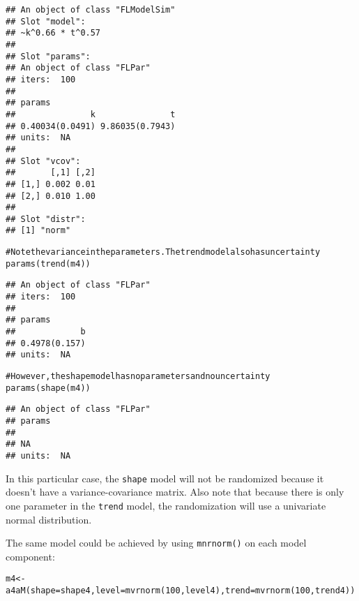 \documentclass[a4paper,english,10pt]{article}\usepackage[]{graphicx}\usepackage[]{color}
\makeatletter
\newcommand{\hlnum}[1]{\textcolor[rgb]{0.2,0.2,0.2}{#1}}%
\newcommand{\hlcom}[1]{\textcolor[rgb]{0.2,0.267,0.4}{#1}}%
\newcommand{\hlstd}[1]{\textcolor[rgb]{0,0,0}{#1}}%
\newcommand{\hlkwb}[1]{\textcolor[rgb]{0.361,0.506,0.596}{#1}}%
\newcommand{\hlkwc}[1]{\textcolor[rgb]{0.361,0.506,0.596}{#1}}%
\newcommand{\hlkwd}[1]{\textcolor[rgb]{0.361,0.506,0.596}{#1}}%
\newenvironment{kframe}{%
 \def\at@end@of@kframe{}%
 \ifinner\ifhmode%
  \def\at@end@of@kframe{\end{minipage}}%
  \begin{minipage}{\columnwidth}%
 \fi\fi%
 \def\FrameCommand##1{\hskip\@totalleftmargin \hskip-\fboxsep
 \colorbox{shadecolor}{##1}\hskip-\fboxsep
     \hskip-\linewidth \hskip-\@totalleftmargin \hskip\columnwidth}%
 \MakeFramed {\advance\hsize-\width
   \@totalleftmargin\z@ \linewidth\hsize
   \@setminipage}}%
 {\par\unskip\endMakeFramed%
 \at@end@of@kframe}
\newenvironment{knitrout}{}{} %
\newcommand{\code}[1]{{\texttt{#1}}}
\makeatother
\begin{document}
\begin{knitrout}
\begin{kframe}
\begin{verbatim}
## An object of class "FLModelSim"
## Slot "model":
## ~k^0.66 * t^0.57
## 
## Slot "params":
## An object of class "FLPar"
## iters:  100 
## 
## params
##               k               t 
## 0.40034(0.0491) 9.86035(0.7943) 
## units:  NA 
## 
## Slot "vcov":
##       [,1] [,2]
## [1,] 0.002 0.01
## [2,] 0.010 1.00
## 
## Slot "distr":
## [1] "norm"
\end{verbatim}
\begin{alltt}
\hlcom{# Note the variance in the parameters. The trend model also has uncertainty}
\hlkwd{params}\hlstd{(}\hlkwd{trend}\hlstd{(m4))}
\end{alltt}
\begin{verbatim}
## An object of class "FLPar"
## iters:  100 
## 
## params
##             b 
## 0.4978(0.157) 
## units:  NA
\end{verbatim}
\begin{alltt}
\hlcom{# However, the shape model has no parameters and no uncertainty}
\hlkwd{params}\hlstd{(}\hlkwd{shape}\hlstd{(m4))}
\end{alltt}
\begin{verbatim}
## An object of class "FLPar"
## params
##    
## NA 
## units:  NA
\end{verbatim}
\end{kframe}
\end{knitrout}

In this particular case, the \code{shape} model will not be randomized because it doesn't have a variance-covariance matrix. Also note that because there is only one parameter in the \code{trend} model, the randomization will use a univariate normal distribution.

The same model could be achieved by using \code{mnrnorm()} on each model component:

\begin{knitrout}
\color{fgcolor}\begin{kframe}
\begin{alltt}
\hlstd{m4} \hlkwb{<-} \hlkwd{a4aM}\hlstd{(}\hlkwc{shape}\hlstd{=shape4,} \hlkwc{level}\hlstd{=}\hlkwd{mvrnorm}\hlstd{(}\hlnum{100}\hlstd{, level4),} \hlkwc{trend}\hlstd{=}\hlkwd{mvrnorm}\hlstd{(}\hlnum{100}\hlstd{, trend4))}
\end{alltt}
\end{kframe}
\end{knitrout}

\end{document}
